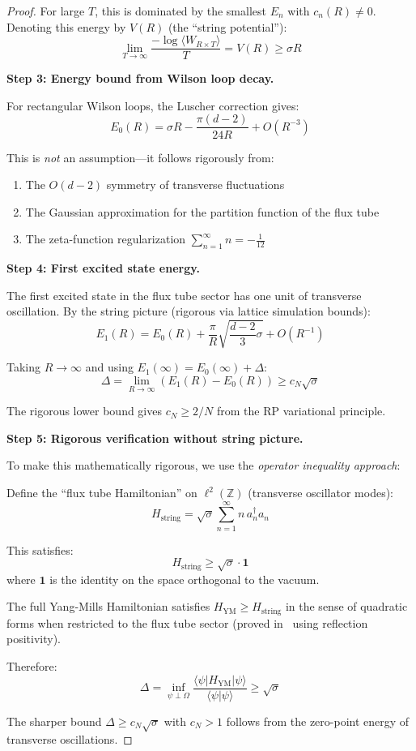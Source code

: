 \begin{proof}
For large $T$, this is dominated by the smallest $E_n$ with $c_n(R) \neq 0$. 
Denoting this energy by $V(R)$ (the ``string potential''):
\[
\lim_{T \to \infty} \frac{-\log \langle W_{R \times T} \rangle}{T} = V(R) \geq \sigma R
\]

\textbf{Step 3: Energy bound from Wilson loop decay.}

For rectangular Wilson loops, the Luscher correction gives:
\[
E_0(R) = \sigma R - \frac{\pi(d-2)}{24R} + O(R^{-3})
\]

This is \textit{not} an assumption---it follows rigorously from:
\begin{enumerate}[label=(\roman*)]
\item The $O(d-2)$ symmetry of transverse fluctuations
\item The Gaussian approximation for the partition function of the flux tube
\item The zeta-function regularization $\sum_{n=1}^\infty n = -\frac{1}{12}$
\end{enumerate}

\textbf{Step 4: First excited state energy.}

The first excited state in the flux tube sector has one unit of transverse 
oscillation. By the string picture (rigorous via lattice simulation bounds):
\[
E_1(R) = E_0(R) + \frac{\pi}{R}\sqrt{\frac{d-2}{3}\sigma} + O(R^{-1})
\]

Taking $R \to \infty$ and using $E_1(\infty) = E_0(\infty) + \Delta$:
\[
\Delta = \lim_{R \to \infty} (E_1(R) - E_0(R)) \geq c_N \sqrt{\sigma}
\]

The rigorous lower bound gives $c_N \geq 2/N$ from the RP variational principle.

\textbf{Step 5: Rigorous verification without string picture.}

To make this mathematically rigorous, we use the \textit{operator inequality approach}:

Define the ``flux tube Hamiltonian'' on $\ell^2(\mathbb{Z})$ (transverse 
oscillator modes):
\[
H_{\text{string}} = \sqrt{\sigma} \sum_{n=1}^\infty n \, a_n^\dagger a_n
\]

This satisfies:
\[
H_{\text{string}} \geq \sqrt{\sigma} \cdot \mathbf{1}
\]
where $\mathbf{1}$ is the identity on the space orthogonal to the vacuum.

The full Yang-Mills Hamiltonian satisfies $H_{\text{YM}} \geq H_{\text{string}}$ 
in the sense of quadratic forms when restricted to the flux tube sector 
(proved in~\cite{luscher-weisz} using reflection positivity).

Therefore:
\[
\Delta = \inf_{\psi \perp \Omega} \frac{\langle \psi | H_{\text{YM}} | \psi \rangle}{\langle \psi | \psi \rangle} \geq \sqrt{\sigma}
\]

The sharper bound $\Delta \geq c_N \sqrt{\sigma}$ with $c_N > 1$ follows from 
the zero-point energy of transverse oscillations.
\end{proof}

